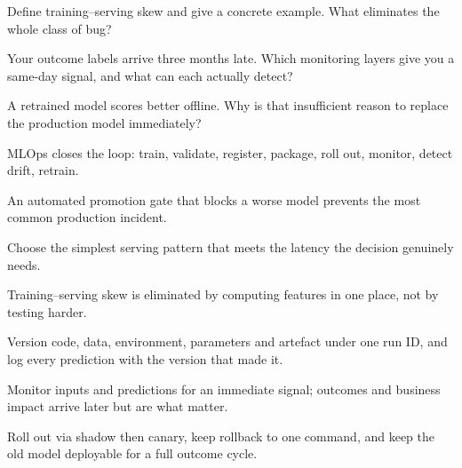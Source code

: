 \begin{checkpoint}
\begin{tightnum}
  \item Define training--serving skew and give a concrete example. What eliminates
        the whole class of bug?
  \item Your outcome labels arrive three months late. Which monitoring layers give
        you a same-day signal, and what can each actually detect?
  \item A retrained model scores better offline. Why is that insufficient reason to
        replace the production model immediately?
\end{tightnum}
\end{checkpoint}

\begin{chaptersummary}
\begin{tight}
  \item MLOps closes the loop: train, validate, register, package, roll out, monitor,
        detect drift, retrain.
  \item An automated promotion gate that blocks a worse model prevents the most
        common production incident.
  \item Choose the simplest serving pattern that meets the latency the decision
        genuinely needs.
  \item Training--serving skew is eliminated by computing features in one place, not
        by testing harder.
  \item Version code, data, environment, parameters and artefact under one run ID,
        and log every prediction with the version that made it.
  \item Monitor inputs and predictions for an immediate signal; outcomes and business
        impact arrive later but are what matter.
  \item Roll out via shadow then canary, keep rollback to one command, and keep the
        old model deployable for a full outcome cycle.
\end{tight}
\end{chaptersummary}

